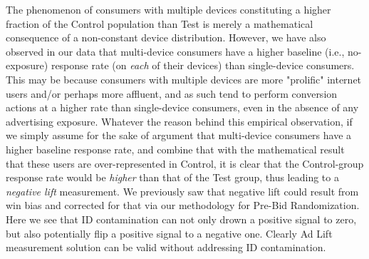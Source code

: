\documentclass[11pt,a4paper]{article}
\theoremstyle{definition}
\theoremstyle{remark}
\theoremstyle{definition}
\theoremstyle{definition}
\theoremstyle{definition}
\theoremstyle{definition}
\theoremstyle{definition}
\theoremstyle{definition}
\begin{document}
The phenomenon of consumers with multiple devices constituting a higher fraction of the Control population than Test is merely a mathematical consequence of a non-constant device distribution. However, we have also observed in our data that multi-device consumers  have a higher baseline (i.e., no-exposure) response rate (on \textit{each} of their devices) than single-device consumers. This may be because consumers with multiple devices are more "prolific" internet users and/or perhaps more affluent, and as such tend to perform conversion actions at a higher rate than single-device consumers, even in the absence of any advertising exposure. Whatever the reason behind this empirical observation, if we simply assume for the sake of argument that multi-device consumers have a higher baseline response rate, and combine that with the mathematical result that these users are over-represented in Control, it is clear that the Control-group response rate would be \textit{higher} than that of the Test group, thus leading to a \textit{negative lift} measurement. We previously saw that negative lift could result from win bias and corrected for that via our methodology for Pre-Bid Randomization. Here we see that ID contamination can not only drown a positive signal to zero, but also potentially flip a positive signal to a negative one. Clearly Ad Lift measurement solution can be valid without addressing ID contamination.
\end{document}
